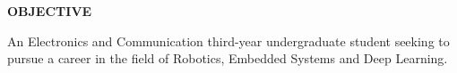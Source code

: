 \documentclass[a4paper]{article}
\begin{document}

	\begin{flushleft}
		\vspace{5mm}
		\large{\textbf{OBJECTIVE}} 
		\vspace{0.5mm}
		\noindent\hrulefill
		\vspace{0.5mm}
	\end{flushleft}
	\begin{flushleft}
		An Electronics and Communication third-year undergraduate student seeking to
		pursue a career in the field of Robotics, Embedded Systems and Deep Learning.
	\end{flushleft}
\end{document}

